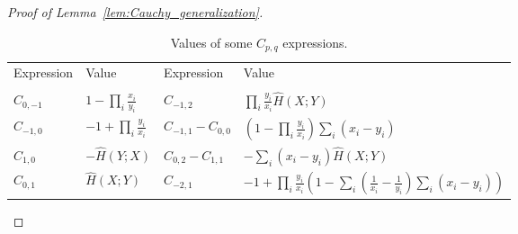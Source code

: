 \documentclass{article}
\numberwithin{equation}{section}
\begin{document}
\begin{proof}[Proof of Lemma~\ref{lem:Cauchy_generalization}]
\begin{table}
\begin{tabular}{ |p{1.7cm}|p{2.5cm}|p{1.8cm}|p{7.5cm}|  }
    \hline
    \rule{0pt}{0.6cm}
	Expression& Value &Expression&Value\\
	&&&\\
	\hline
	\rule{0pt}{0.6cm}$C_{0,-1}$   & $\displaystyle 1-\prod_i \frac{x_i}{y_i}$    &
	$C_{-1,2}$ &$\displaystyle \prod_i\frac{y_i}{x_i} \hat H(X;Y)$
	\\
    \hline
	\rule{0pt}{0.6cm}
	$C_{-1,0}$& $\displaystyle-1+ \prod_i \frac{y_i}{x_i}$&$C_{-1,1}-C_{0,0}$ & $\displaystyle \left(1-\prod_i\frac{y_i}{x_i}\right)\sum_i(x_i-y_i)$
	\\
	\hline
		\rule{0pt}{0.6cm}
	$C_{1,0}$ & $\displaystyle -\hat H(Y;X)$
	& 	$C_{0,2}-C_{1,1}$
	&$\displaystyle -\sum_i(x_i-y_i) \hat H(X;Y)$
	\\
	\hline
			\rule{0pt}{0.6cm}
			$C_{0,1}$& $\displaystyle \hat H(X;Y)$&$C_{-2,1}$& $\displaystyle -1 + \prod_i\frac{y_i}{x_i}\left( 1- \sum_i\left(\frac{1}{x_i}-\frac{1}{y_i}\right)\sum_i\left(x_i-y_i\right)\right)$\\
	\hline
\end{tabular}
\caption{\label{table:C}Values of some $C_{p,q}$ expressions.}
\end{table}



\end{proof}
\end{document}
